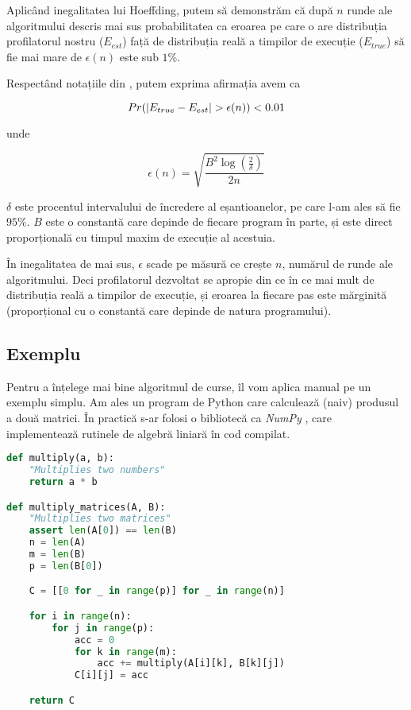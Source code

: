 Aplicând inegalitatea lui Hoeffding, putem să demonstrăm că după \(n\) runde ale algoritmului descris mai sus probabilitatea ca eroarea pe care o are distribuția profilatorul nostru (\(E_{est}\)) față de distribuția reală a timpilor de execuție (\(E_{true}\)) să fie mai mare de \(\epsilon(n)\) este sub \(1\%\).

Respectând notațiile din \cite{hoeffding_races}, putem exprima afirmația avem ca

\[Pr(\lvert E_{true} - E_{est}\rvert > \epsilon(n)) < 0.01\]

unde

\[\epsilon(n) = \sqrt{\frac{B^2 \log (\frac{2}{\delta})}{2n}}\]

\(\delta\) este procentul intervalului de încredere al eșantioanelor, pe care l-am ales să fie \(95\%\). \(B\) este o constantă care depinde de fiecare program în parte, și este direct proporțională cu timpul maxim de execuție al acestuia.

În inegalitatea de mai sus, \(\epsilon\) scade pe măsură ce crește \(n\), numărul de runde ale algoritmului. Deci profilatorul dezvoltat se apropie din ce în ce mai mult de distribuția reală a timpilor de execuție, și eroarea la fiecare pas este mărginită (proporțional cu o constantă care depinde de natura programului).

\subsection{Exemplu}

Pentru a înțelege mai bine algoritmul de curse, îl vom aplica manual pe un exemplu simplu. Am ales un program de Python care calculează (naiv) produsul a două matrici. În practică s-ar folosi o bibliotecă ca \emph{NumPy} \cite{numpy}, care implementează rutinele de algebră liniară în cod compilat.

\begin{lstlisting}[language=Python]
def multiply(a, b):
    "Multiplies two numbers"
    return a * b

def multiply_matrices(A, B):
    "Multiplies two matrices"
    assert len(A[0]) == len(B)
    n = len(A)
    m = len(B)
    p = len(B[0])

    C = [[0 for _ in range(p)] for _ in range(n)]

    for i in range(n):
        for j in range(p):
            acc = 0
            for k in range(m):
                acc += multiply(A[i][k], B[k][j])
            C[i][j] = acc

    return C
\end{lstlisting}

